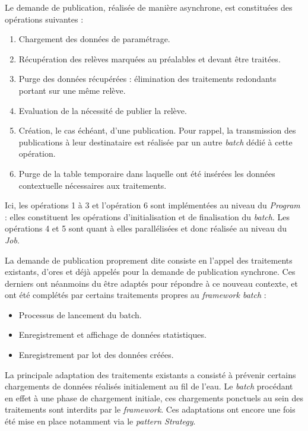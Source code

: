 \documentclass[a4paper, 12pt]{report}
\begin{document}
Le demande de publication, réalisée de manière asynchrone, est constituées des opérations suivantes :

\begin{enumerate}
  \item Chargement des données de paramétrage.
  \item Récupération des relèves marquées au préalables et devant être traitées.
  \item Purge des données récupérées : élimination des traitements redondants portant sur une même relève.
  \item Evaluation de la nécessité de publier la relève.
  \item Création, le cas échéant, d'une publication. Pour rappel, la transmission des publications à leur destinataire est réalisée par un autre \textit{batch} dédié à cette opération.
  \item Purge de la table temporaire dans laquelle ont été insérées les données contextuelle nécessaires aux traitements.
\end{enumerate}
\vspace{0.5cm}

Ici, les opérations 1 à 3 et l'opération 6 sont implémentées au niveau du \textit{Program} : elles constituent les opérations d'initialisation et de finalisation du \textit{batch}. Les opérations 4 et 5 sont quant à elles parallélisées et donc réalisée au niveau du \textit{Job}.

La demande de publication proprement dite consiste en l'appel des traitements existants, d'ores et déjà appelés pour la demande de publication synchrone. Ces derniers ont néanmoins du être adaptés pour répondre à ce nouveau contexte, et ont été complétés par certains traitements propres au \textit{framework batch} :\\

\begin{itemize}
  \item Processus de lancement du batch.
  \item Enregistrement et affichage de données statistiques.
  \item Enregistrement par lot des données créées.
\end{itemize}
\vspace{0.5cm}

La principale adaptation des traitements existants a consisté à prévenir certains chargements de données réalisés initialement au fil de l'eau. Le \textit{batch} procédant en effet à une phase de chargement initiale, ces chargements ponctuels au sein des traitements sont interdits par le \textit{framework}. Ces adaptations ont encore une fois été mise en place notamment via le \textit{pattern Strategy}.
\end{document}
